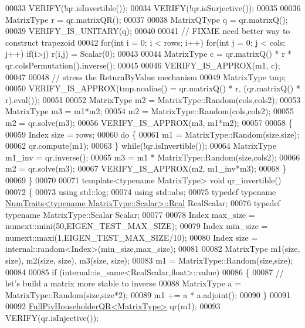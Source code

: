\begin{DoxyCode}
00033   VERIFY(!qr.isInvertible());
00034   VERIFY(!qr.isSurjective());
00035 
00036   MatrixType r = qr.matrixQR();
00037   
00038   MatrixQType q = qr.matrixQ();
00039   VERIFY\_IS\_UNITARY(q);
00040   
00041   \textcolor{comment}{// FIXME need better way to construct trapezoid}
00042   \textcolor{keywordflow}{for}(\textcolor{keywordtype}{int} i = 0; i < rows; i++) for(int j = 0; j < cols; j++) if(i>j) r(i,j) = Scalar(0);
00043 
00044   MatrixType c = qr.matrixQ() * r * qr.colsPermutation().inverse();
00045 
00046   VERIFY\_IS\_APPROX(m1, c);
00047   
00048   \textcolor{comment}{// stress the ReturnByValue mechanism}
00049   MatrixType tmp;
00050   VERIFY\_IS\_APPROX(tmp.noalias() = qr.matrixQ() * r, (qr.matrixQ() * r).eval());
00051   
00052   MatrixType m2 = MatrixType::Random(cols,cols2);
00053   MatrixType m3 = m1*m2;
00054   m2 = MatrixType::Random(cols,cols2);
00055   m2 = qr.solve(m3);
00056   VERIFY\_IS\_APPROX(m3, m1*m2);
00057 
00058   \{
00059     Index size = rows;
00060     \textcolor{keywordflow}{do} \{
00061       m1 = MatrixType::Random(size,size);
00062       qr.compute(m1);
00063     \} \textcolor{keywordflow}{while}(!qr.isInvertible());
00064     MatrixType m1\_inv = qr.inverse();
00065     m3 = m1 * MatrixType::Random(size,cols2);
00066     m2 = qr.solve(m3);
00067     VERIFY\_IS\_APPROX(m2, m1\_inv*m3);
00068   \}
00069 \}
00070 
00071 \textcolor{keyword}{template}<\textcolor{keyword}{typename} MatrixType> \textcolor{keywordtype}{void} qr\_invertible()
00072 \{
00073   \textcolor{keyword}{using} std::log;
00074   \textcolor{keyword}{using} std::abs;
00075   \textcolor{keyword}{typedef} \textcolor{keyword}{typename} \hyperlink{group___core___module_struct_eigen_1_1_num_traits}{NumTraits<typename MatrixType::Scalar>::Real}
       RealScalar;
00076   \textcolor{keyword}{typedef} \textcolor{keyword}{typename} MatrixType::Scalar Scalar;
00077 
00078   Index max\_size = numext::mini(50,EIGEN\_TEST\_MAX\_SIZE);
00079   Index min\_size = numext::maxi(1,EIGEN\_TEST\_MAX\_SIZE/10);
00080   Index size = internal::random<Index>(min\_size,max\_size);
00081 
00082   MatrixType m1(size, size), m2(size, size), m3(size, size);
00083   m1 = MatrixType::Random(size,size);
00084 
00085   \textcolor{keywordflow}{if} (internal::is\_same<RealScalar,float>::value)
00086   \{
00087     \textcolor{comment}{// let's build a matrix more stable to inverse}
00088     MatrixType a = MatrixType::Random(size,size*2);
00089     m1 += a * a.adjoint();
00090   \}
00091 
00092   \hyperlink{group___q_r___module}{FullPivHouseholderQR<MatrixType>} qr(m1);
00093   VERIFY(qr.isInjective());

\end{DoxyCode}
